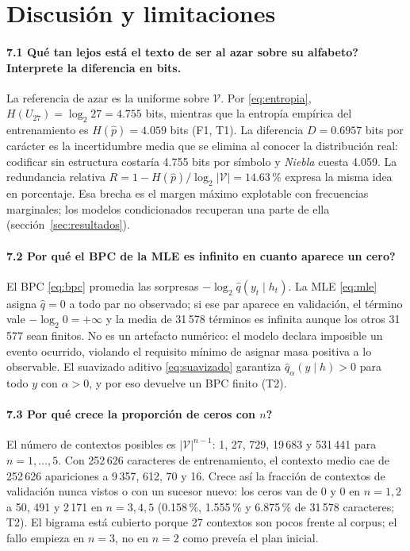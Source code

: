 \documentclass[11pt,letterpaper]{article}
\begin{document}
\section{Discusión y limitaciones}\label{sec:discusion}

\paragraph{7.1 \textquestiondown{}Qué tan lejos está el texto de ser \guillemotleft{}al azar\guillemotright{} sobre su alfabeto? Interprete la diferencia en bits.}
La referencia de azar es la uniforme sobre $\mathcal{V}$. Por \eqref{eq:entropia}, $H(U_{27})=\log_2 27=4.755$ bits, mientras que la entropía empírica del entrenamiento es $H(\hat p)=4.059$ bits (F1, T1). La diferencia $D=0.6957$ bits por carácter es la incertidumbre media que se elimina al conocer la distribución real: codificar sin estructura costaría 4.755 bits por símbolo y \emph{Niebla} cuesta 4.059. La redundancia relativa $R=1-H(\hat p)/\log_2|\mathcal{V}|=14.63\,\text{\%}$ expresa la misma idea en porcentaje. Esa brecha es el margen máximo explotable con frecuencias marginales; los modelos condicionados recuperan una parte de ella (sección~\ref{sec:resultados}).

\paragraph{7.2 \textquestiondown{}Por qué el BPC de la MLE es infinito en cuanto aparece un cero?}
El BPC \eqref{eq:bpc} promedia las sorpresas $-\log_2\hat q(y_t\mid h_t)$. La MLE \eqref{eq:mle} asigna $\hat q=0$ a todo par no observado; si ese par aparece en validación, el término vale $-\log_2 0=+\infty$ y la media de 31\,578 términos es infinita aunque los otros 31\,577 sean finitos. No es un artefacto numérico: el modelo declara imposible un evento ocurrido, violando el requisito mínimo de asignar masa positiva a lo observable. El suavizado aditivo \eqref{eq:suavizado} garantiza $\hat q_\alpha(y\mid h)>0$ para todo $y$ con $\alpha>0$, y por eso devuelve un BPC finito (T2).

\paragraph{7.3 \textquestiondown{}Por qué crece la proporción de ceros con $n$?}
El número de contextos posibles es $|\mathcal{V}|^{n-1}$: 1, 27, 729, 19\,683 y 531\,441 para $n=1,\ldots,5$. Con 252\,626 caracteres de entrenamiento, el contexto medio cae de 252\,626 apariciones a 9\,357, 612, 70 y 16. Crece así la fracción de contextos de validación nunca vistos o con un sucesor nuevo: los ceros van de 0 y 0 en $n=1,2$ a 50, 491 y 2\,171 en $n=3,4,5$ (0.158\,\%, 1.555\,\% y 6.875\,\% de 31\,578 caracteres; T2). El bigrama está cubierto porque 27 contextos son pocos frente al corpus; el fallo empieza en $n=3$, no en $n=2$ como preveía el plan inicial.
\end{document}
